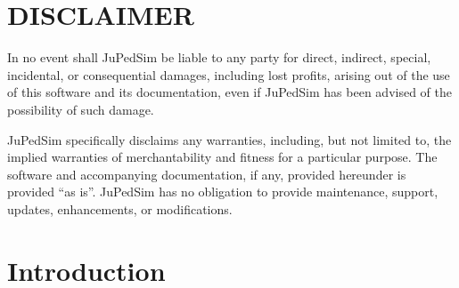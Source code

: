 \documentclass[%
paper=A4,					%
twoside=true,				%
openright,					%
parskip=full,				%
chapterprefix=true,			%
11pt,						%
headings=normal,			%
bibliography=totoc,			%
listof=totoc,				%
titlepage=on,				%
captions=tableabove,		%
draft=false,				%
]{scrreprt}%
\begin{document}

\pagestyle{plain}
\let\cleardoublepage\clearpage
{\hypersetup{linkbordercolor=black}
\tableofcontents
}
\chapter{DISCLAIMER}
In no event shall JuPedSim be liable to any party for direct, indirect, special, incidental, or consequential damages, including lost profits, arising out of the use of this software and its documentation, even if JuPedSim has been advised of the possibility of such damage.

JuPedSim specifically disclaims any warranties, including, but not limited to, the implied warranties of merchantability and fitness for a particular purpose. The software and accompanying documentation, if any, provided hereunder is provided ``as is''. JuPedSim has no obligation to provide maintenance, support, updates, enhancements, or modifications.





\chapter{Introduction}

 \newpage
\end{document}
